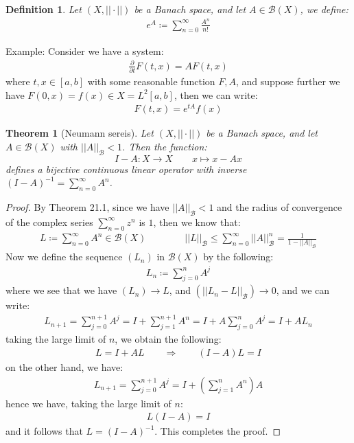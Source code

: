 \documentclass[11pt]{book}
\theoremstyle{break}
\theoremstyle{break}
\newtheorem{thm}{Theorem}[section]
\newtheorem{defn}{Definition}[corL]
\newcommand{\example}{\color{green}Example: \color{black}}
\begin{document}
\begin{defn}
Let $(X, ||\cdot ||)$ be a Banach space, and let $A \in  \mathcal{B}(X)$, we define:
\begin{align*}
e^A \coloneqq \sum_{n=0}^\infty \frac{A^n}{n!}
\end{align*}
\end{defn}

\example
Consider we have a system:
\begin{align*}
\frac{\partial}{\partial t} F(t,x) = AF(t,x)
\end{align*}
where $t,x \in [a,b]$ with some reasonable function $F,A$, and suppose further we have $F(0,x) = f(x) \in X = L^2[a,b]$, then we can write:
\begin{align*}
F(t,x) = e^{tA}f(x)
\end{align*}



\begin{thm}[Neumann sereis]
Let $(X,||\cdot ||)$ be a Banach space, and let $A \in \mathcal{B}(X)$ with $||A||_{\mathcal{B}}<1$. Then the function:
$$I-A : X \to X \qquad x\mapsto x-Ax$$
defines a bijective continuous linear operator with inverse $(I-A)^{-1} = \sum_{n=0}^\infty A^n$. 
\end{thm}
\begin{proof}
By Theorem 21.1, since we have $||A||_{\mathcal{B}}<1$ and the radius of convergence of the complex series $\sum_{n=0}^\infty z^n$ is $1$, then we know that:
\begin{align*}
L \coloneqq \sum_{n=0}^\infty A^n \in \mathcal{B}(X) \qquad\qquad ||L||_{\mathcal{B}} \leq \sum_{n=0}^\infty ||A||^n_{\mathcal{B}} = \frac{1}{1- ||A||_{\mathcal{B}}}
\end{align*}
Now we define the sequence $(L_n)$ in $\mathcal{B}(X)$ by the following:
\begin{align*}
L_n \coloneqq \sum_{j=0}^n A^j
\end{align*}
where we see that we have $(L_n) \to L$, and $(||L_n - L||_{\mathcal{B}}) \to 0$, and we can write:
\begin{align*}
L_{n+1} = \sum_{j=0}^{n+1}A^j = I + \sum_{j=1}^{n+1}A^n = I+A \sum_{j=0}^n A^j = I+AL_n
\end{align*}
taking the large limit of $n$, we obtain the following:
\begin{align*}
L = I + AL \qquad \Rightarrow \qquad (I-A) L = I
\end{align*}
on the other hand, we have:
\begin{align*}
L_{n+1} = \sum_{j=0}^{n+1}A^j = I + \left(\sum_{j=1}^{n}A^n\right)A 
\end{align*}
hence we have, taking the large limit of $n$:
\begin{align*}
L(I-A) = I
\end{align*}
and it follows that $L = (I-A)^{-1}$. This completes the proof. 
\end{proof}
\end{document}
